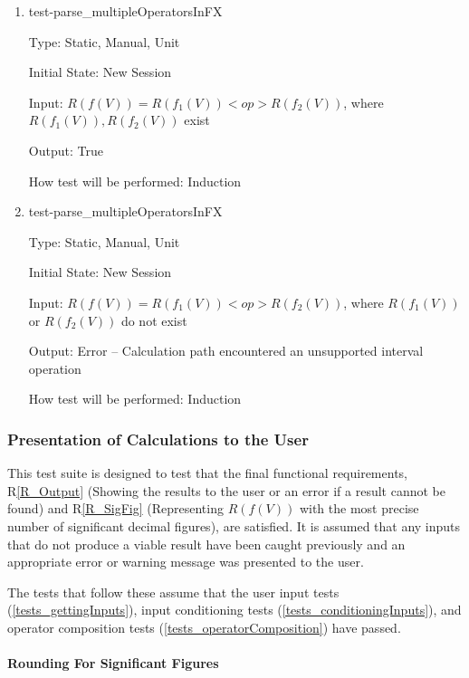 \documentclass[12pt, titlepage]{article}
\newcommand{\rref}[1]{R\ref{#1}}
\begin{document}
\begin{enumerate}
	
	\item{test-parse\_multipleOperatorsInFX}
	
	Type: Static, Manual, Unit
	
	Initial State: New Session
	
	Input: $R(f(V)) = R(f_1(V)) <op> R(f_2(V))$, where $R(f_1(V)), R(f_2(V))$ 
	exist
	
	Output: True
	
	How test will be performed: Induction\\
	
	\item{test-parse\_multipleOperatorsInFX}
	
	Type: Static, Manual, Unit
	
	Initial State: New Session
	
	Input: $R(f(V)) = R(f_1(V)) <op> R(f_2(V))$, where $R(f_1(V))$ or 
	$R(f_2(V))$ do not exist
	
	Output: Error -- Calculation path encountered an unsupported interval 
	operation
	
	How test will be performed: Induction\\
	
\end{enumerate}

\subsubsection{Presentation of Calculations to the User}
\label{tests_outputResults}
This test suite is designed to test that the final functional requirements, 
\rref{R_Output} (Showing the results to the user or an error if a result cannot 
be found) and \rref{R_SigFig} (Representing $R(f(V))$ with the most precise 
number of significant decimal figures), are satisfied. It is assumed that any 
inputs that do not produce a viable result have been caught previously and an 
appropriate error or warning message was presented to the user.

The tests that follow these assume that the user input tests 
(\ref{tests_gettingInputs}), input conditioning tests 
(\ref{tests_conditioningInputs}), and operator composition tests 
(\ref{tests_operatorComposition}) have passed.

\paragraph{Rounding For Significant Figures}
\end{document}
